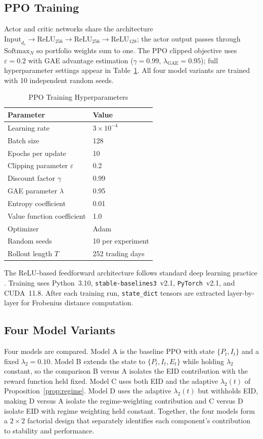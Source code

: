 \documentclass[12pt]{article}
\begin{document}
\subsection{PPO Training}

Actor and critic networks share the architecture
$\mathrm{Input}_{d_s}\to\mathrm{ReLU}_{256}\to\mathrm{ReLU}_{256}
\to\mathrm{ReLU}_{128}$; the actor output passes through
$\mathrm{Softmax}_N$ so portfolio weights sum to one. The PPO
clipped objective uses $\varepsilon=0.2$ with GAE advantage estimation
($\gamma=0.99$, $\lambda_{\mathrm{GAE}}=0.95$); full hyperparameter
settings appear in Table~\ref{tab:hyperparams}. All four model
variants are trained with 10 independent random seeds.

\begin{table}[H]
\centering
\caption{PPO Training Hyperparameters}
\label{tab:hyperparams}
\small
\begin{tabular}{ll}
\toprule
Parameter & Value \\
\midrule
Learning rate & $3\times10^{-4}$ \\
Batch size & 128 \\
Epochs per update & 10 \\
Clipping parameter $\varepsilon$ & 0.2 \\
Discount factor $\gamma$ & 0.99 \\
GAE parameter $\lambda$ & 0.95 \\
Entropy coefficient & 0.01 \\
Value function coefficient & 1.0 \\
Optimizer & Adam \\
Random seeds & 10 per experiment \\
Rollout length $T$ & 252 trading days \\
\bottomrule
\end{tabular}
\end{table}

The ReLU-based feedforward architecture follows standard deep learning practice \citep{lecun2015deep}. Training uses Python~3.10, \texttt{stable-baselines3}~v2.1, \texttt{PyTorch}~v2.1, and CUDA~11.8. After each training run, \texttt{state\_dict} tensors are extracted layer-by-layer for Frobenius distance computation.

\subsection{Four Model Variants}

Four models are compared. Model A is the baseline PPO with state $\{P_t,I_t\}$ and a fixed $\lambda_2=0.10$. Model B extends the state to $\{P_t,I_t,E_t\}$ while holding $\lambda_2$ constant, so the comparison B versus A isolates the EID contribution with the reward function held fixed. Model C uses both EID and the adaptive $\lambda_2(t)$ of Proposition~\ref{prop:regime}. Model D uses the adaptive $\lambda_2(t)$ but withholds EID, making D versus A isolate the regime-weighting contribution and C versus D isolate EID with regime weighting held constant. Together, the four models form a $2\times2$ factorial design that separately identifies each component's contribution to stability and performance.
\end{document}
